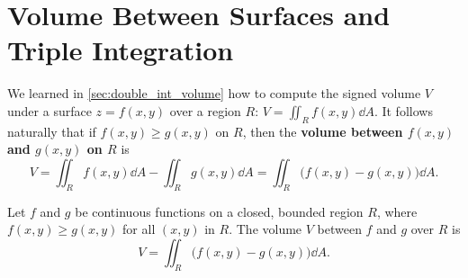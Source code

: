 \section[Volume Between Surfaces and Triple Integration]{\!Volume Between Surfaces and Triple Integration}\label{sec:triple_int}

We learned in \autoref{sec:double_int_volume} how to compute the signed volume $V$ under a surface $z=f(x,y)$ over a region $R$: $V = \iint_R f(x,y)\dd A$. It follows naturally that if $f(x,y)\geq g(x,y)$ on $R$, then the \textbf{volume between $f(x,y)$ and $g(x,y)$ on $R$} is 
\[
V = \iint_R f(x,y)\dd A - \iint_R g(x,y)\dd A = \iint_R \bigl(f(x,y)-g(x,y)\bigr)\dd A.
\]

\begin{theorem}\label{thm:volume_between_surfaces}%
Let $f$ and $g$ be continuous functions on a closed, bounded region $R$, where $f(x,y)\geq g(x,y)$ for all $(x,y)$ in $R$. The volume $V$ between $f$ and $g$ over $R$ is
\[V =\iint_R \bigl(f(x,y)-g(x,y)\bigr)\dd A.\]
\end{theorem}

